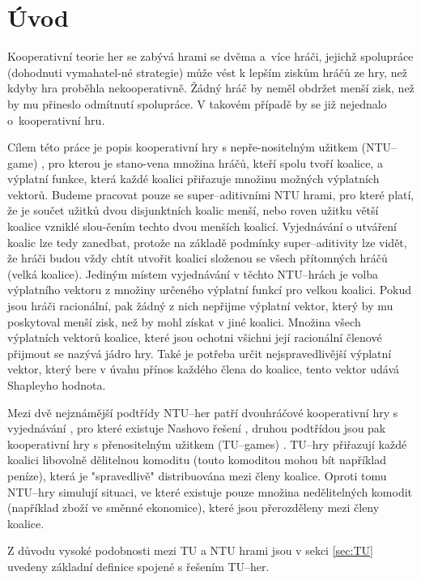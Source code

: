 \section{Úvod}
    Kooperativní teorie her se zabývá hrami se dvěma a~více hráči, jejichž spolupráce (dohodnuti vymahatel-né strategie) může vést k lepším ziskům hráčů ze hry, než kdyby hra proběhla nekooperativně. Žádný hráč by neměl obdržet menší zisk, než by mu přineslo odmítnutí spolupráce. V takovém případě by se již nejednalo o~kooperativní hru.

    Cílem této práce je popis kooperativní hry s nepře-nositelným užitkem (NTU--game) \cite{Coop_intro,Game_Theory,EOLSS}, pro kterou je stano-vena množina hráčů, kteří spolu tvoří koalice, a výplatní funkce, která každé koalici přiřazuje množinu možných výplatních vektorů. Budeme pracovat pouze se super--aditivními NTU hrami, pro které platí, že je součet užitků dvou disjunktních koalic menší, nebo roven užitku větší koalice vzniklé slou-čením techto dvou menších koalicí. Vyjednávání o utváření koalic lze tedy zanedbat, protože na základě podmínky super--aditivity lze vidět, že hráči budou vždy chtít utvořit koalici složenou se všech přítomných hráčů (velká koalice). Jediným místem vyjednávání v těchto NTU--hrách je volba výplatního vektoru z množiny určeného výplatní funkcí pro velkou koalici. Pokud jsou hráči racionální, pak žádný z nich nepřijme výplatní vektor, který by mu poskytoval menší zisk, než by mohl získat v jiné koalici. Množina všech výplatních vektorů koalice, které jsou ochotni všichni její racionální členové přijmout se nazývá jádro hry. Také je potřeba určit nejspravedlivější výplatní vektor, který bere v úvahu přínos každého člena do koalice, tento vektor udává Shapleyho \cite{Shapley1969} hodnota.

    Mezi dvě nejznámější podtřídy NTU--her patří dvouhráčové kooperativní hry s vyjednávání \cite{Game_Theory}, pro které existuje Nashovo řešení \cite{Nash1950}, druhou podtřídou jsou pak kooperativní hry s přenositelným užitkem (TU--games) \cite{Game_Theory,EOLSS}. TU--hry přiřazují každé koalici libovolně dělitelnou komoditu (touto komoditou mohou bít například peníze), která je "spravedlivě" distribuována mezi členy koalice. Oproti tomu NTU--hry simulují situaci, ve které existuje pouze množina nedělitelných komodit (například zboží ve směnné ekonomice), které jsou přerozděleny mezi členy koalice.

    Z důvodu vysoké podobnosti mezi TU a NTU hrami jsou v sekci \ref{sec:TU} uvedeny základní definice spojené s řešením TU--her.


